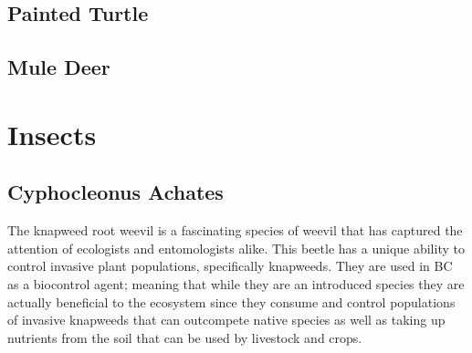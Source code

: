 \documentclass[
]{book}
\begin{document}
\hypertarget{painted-turtle}{%
\section{Painted Turtle}\label{painted-turtle}}

\hypertarget{mule-deer}{%
\section{Mule Deer}\label{mule-deer}}

\hypertarget{insects}{%
\chapter{Insects}\label{insects}}

\hypertarget{cyphocleonus-achates}{%
\section{Cyphocleonus Achates}\label{cyphocleonus-achates}}

The knapweed root weevil is a fascinating species of weevil that has captured the attention of ecologists and entomologists alike. This beetle has a unique ability to control invasive plant populations, specifically knapweeds. They are used in BC as a biocontrol agent; meaning that while they are an introduced species they are actually beneficial to the ecosystem since they consume and control populations of invasive knapweeds that can outcompete native species as well as taking up nutrients from the soil that can be used by livestock and crops.
\end{document}
